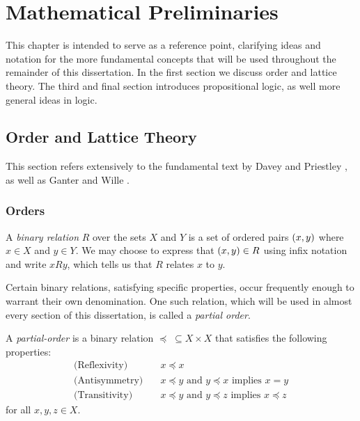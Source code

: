 \chapter{Mathematical Preliminaries}
\label{chapter:mathematical-preliminaries}

This chapter is intended to serve as a reference point, clarifying ideas and notation for the more fundamental
concepts that will be used throughout the remainder of this dissertation. In the first section we
discuss order and lattice theory. The third and final section introduces propositional logic, as
well more general ideas in logic.

\section{Order and Lattice Theory}
\label{section:order-theory}

This section refers extensively to the fundamental text by Davey and Priestley \cite{davey2002introduction},
as well as Ganter and Wille \cite{ganter1999formal}.

\subsection{Orders}
\label{subsection:orders}

A \textit{binary relation}  $R$ over the sets $X$ and $Y$ is a set of ordered
pairs $(x,y)$ where $x \in X$ and $y \in Y$. We may choose to express that $(x,y)\in R$ using infix
notation and write $xRy$, which tells us that $R$ relates $x$ to $y$.

Certain binary relations, satisfying specific properties, occur frequently enough to warrant their
own denomination. One such relation, which will be used in almost every section of this dissertation,
is called a \textit{partial order}.

\begin{definition}
  \label{definition:partial-order} A \textit{partial-order}  is a binary
  relation $\preceq \; \subseteq X \times X$ that satisfies the following properties:
  \begin{align}
    \text{(Reflexivity)}\quad  & x \preceq x                                                     \\
    \text{(Antisymmetry)}\quad & x \preceq y \text{ and }y \preceq x \text{ implies }x = y       \\
    \text{(Transitivity)}\quad & x \preceq y \text{ and }y \preceq z \text{ implies }x \preceq z
  \end{align}
  for all $x,y,z \in X$.
\end{definition}

